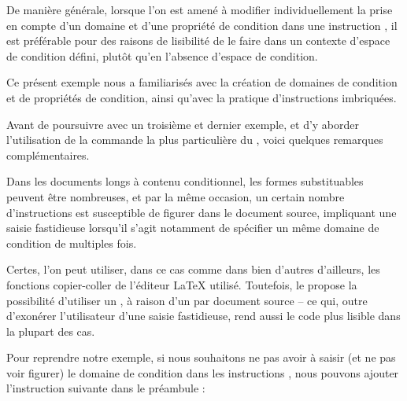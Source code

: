 \documentclass{article}
\newcommand\Latex{\LaTeX\xspace} %
\begin{document}
\begin{codeblock}
    \begin{subcodeblock}
    \end{subcodeblock}
\end{codeblock}

De manière générale, lorsque l'on est amené à modifier individuellement la prise en compte d'un domaine et d'une propriété de condition dans une instruction , il est préférable pour des raisons de lisibilité de le faire dans un contexte d'espace de condition défini, plutôt qu'en l'absence d'espace de condition.

\tutostep
Ce présent exemple nous a familiarisés avec la création de domaines de condition et de propriétés de condition, ainsi qu'avec la pratique d'instructions  imbriquées.

Avant de poursuivre avec un troisième et dernier exemple, et d'y aborder l'utilisation de la commande la plus particulière du , voici quelques remarques complémentaires.

Dans les documents longs à contenu conditionnel, les formes substituables peuvent être nombreuses, et par la même occasion, un certain nombre d'instructions  est susceptible de figurer dans le document source, impliquant une saisie fastidieuse lorsqu'il s'agit notamment de spécifier un même domaine de condition de multiples fois.

Certes, l'on peut utiliser, dans ce cas comme dans bien d'autres d'ailleurs, les fonctions copier-coller de l'éditeur \Latex utilisé. Toutefois, le  propose la possibilité d'utiliser un , à raison d'un par document source -- ce qui, outre d'exonérer l'utilisateur d'une saisie fastidieuse, rend aussi le code plus lisible dans la plupart des cas.

Pour reprendre notre exemple, si nous souhaitons ne pas avoir à saisir (et ne pas voir figurer) le domaine de condition  dans les instructions , nous pouvons ajouter l'instruction suivante dans le préambule :

\begin{codeblock}
\end{codeblock}
\end{document}
